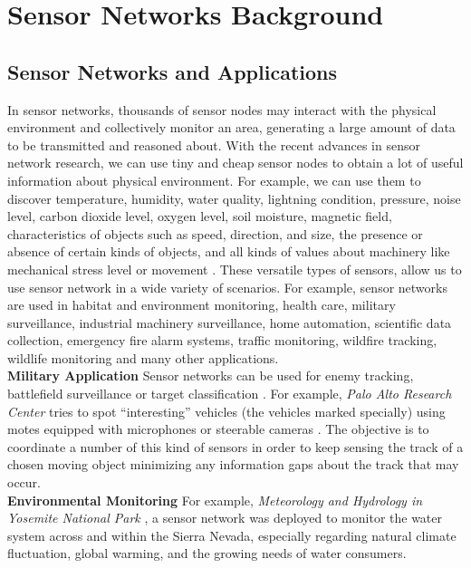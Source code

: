 \chapter{Sensor Networks Background} 
\label{cha:Sensor Networks/Data Aggregation/Security Background}

\section{Sensor Networks and Applications}
	In sensor networks, thousands of sensor nodes may interact with the physical environment and collectively monitor an area, generating a large amount of data to be transmitted and reasoned about.
	With the recent advances in sensor network research, we can use tiny and cheap sensor nodes to obtain a lot of useful information about physical environment.
	For example, we can use them to discover temperature, humidity, water quality, lightning condition, pressure, noise level, carbon dioxide level, oxygen level, soil moisture, magnetic field, characteristics of objects such as speed, direction, and size, the presence or absence of certain kinds of objects, and all kinds of values about machinery like mechanical stress level or movement \cite{hof2007applications}.
	These versatile types of sensors, allow us to use sensor network in a wide variety of scenarios.
	For example, sensor networks are used in habitat and environment monitoring, health care, military surveillance, industrial machinery surveillance, home automation, scientific data collection, emergency fire alarm systems, traffic monitoring, wildfire tracking, wildlife monitoring and many other applications.\\
	\textbf{Military Application}
	Sensor networks can be used for enemy tracking, battlefield surveillance or target classification \cite{li2002detection}.
	For example, \textit{Palo Alto Research Center} tries to spot ``interesting'' vehicles (the vehicles marked specially) using motes equipped with microphones or steerable cameras \cite{chu2004distributed}.
	The objective is to coordinate a number of this kind of sensors in order to keep sensing the track of a chosen moving object minimizing any information gaps about the track that may occur.\\
	\textbf{Environmental Monitoring} 
	For example, \textit{Meteorology and Hydrology in Yosemite National Park} \cite{lundquist2003meteorology}, a sensor network was deployed to monitor the water system across and within the Sierra Nevada, especially regarding natural climate fluctuation, global warming, and the growing needs of water consumers.
